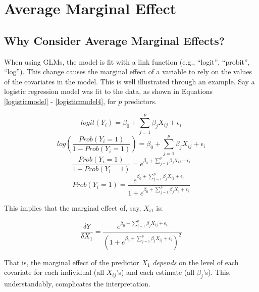 \documentclass[]{DissertateUSU}
\begin{document}
\section{Average Marginal Effect}\label{average-marginal-effect}

\subsection{Why Consider Average Marginal
Effects?}\label{why-consider-average-marginal-effects}

When using GLMs, the model is fit with a link function (e.g., ``logit'',
``probit'', ``log''). This change causes the marginal effect of a
variable to rely on the values of the covariates in the model. This is
well illustrated through an example. Say a logistic regression model was
fit to the data, as shown in Equations \ref{logisticmodel} -
\ref{logisticmodel4}, for \(p\) predictors.

\begin{equation}\label{logisticmodel}
logit(Y_i) = \beta_0 + \sum_{j=1}^p \beta_{j} X_{ij} + \epsilon_i
\end{equation}\begin{equation}\label{logisticmodel2}
log(\frac{Prob(Y_i = 1)}{1 - Prob(Y_i = 1)}) = \beta_0 + \sum_{j=1}^p \beta_{j} X_{ij} + \epsilon_i
\end{equation}\begin{equation}\label{logisticmodel3}
\frac{Prob(Y_i = 1)}{1 - Prob(Y_i = 1)} = e^{\beta_0 + \sum_{j=1}^p \beta_{j} X_{ij} + \epsilon_i}
\end{equation}\begin{equation}\label{logisticmodel4}
Prob(Y_i = 1) = \frac{e^{\beta_0 + \sum_{j=1}^p \beta_{j} X_{ij} + \epsilon_i}}{1 + e^{\beta_0 + \sum_{j=1}^p \beta_{j} X_i + \epsilon_i}}
\end{equation}

\noindent This implies that the marginal effect of, say, \(X_{i1}\) is:

\begin{equation}\label{marginallogistic}
\frac{\delta Y}{\delta X_1} = \frac{e^{\beta_0 + \sum_{j=1}^p \beta_{j} X_{ij} + \epsilon_i}}{(1 + e^{\beta_0 + \sum_{j=1}^p \beta_{j} X_{ij} + \epsilon_i})^2}
\end{equation}

\noindent That is, the marginal effect of the predictor \(X_1\)
\emph{depends} on the level of each covariate for each individual (all
\(X_{ij}\)'s) and each estimate (all \(\beta_j\)'s). This,
understandably, complicates the interpretation.
\end{document}

